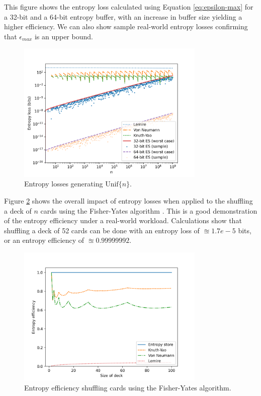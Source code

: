 \documentclass[12pt]{article}
\newcommand{\unif}[1]{\mathrm{Unif}\{#1\}}
\begin{document}
This figure shows the entropy loss calculated using Equation \ref{eq:epsilon-max} for a 32-bit and a 64-bit entropy buffer, with an increase in buffer size yielding a higher efficiency. We can also show sample real-world entropy losses confirming that $\epsilon_{max}$ is an upper bound.

\begin{figure}[ht]
\centering
\includegraphics[width=0.8\textwidth]{uniform_losses.png}
\caption{Entropy losses generating $\unif{n}$.}
\label{fig:uniform-losses}
\end{figure}

Figure \ref{fig:shuffling-efficiency} shows the overall impact of entropy losses when applied to the shuffling a deck of $n$ cards using the Fisher-Yates algorithm \cite{fisher1953statistical, durstenfeld1964algorithm, knuth2014art}. This is a good demonstration of the entropy efficiency under a real-world workload. Calculations show that shuffling a deck of 52 cards can be done with an entropy loss of $\approxeq 1.7e-5$ bits, or an entropy efficiency of $\approxeq 0.99999992$.

\begin{figure}[ht]
\centering
\includegraphics[width=0.8\textwidth]{shuffling_efficiency.png}
\caption{Entropy efficiency shuffling cards using the Fisher-Yates algorithm.}
\label{fig:shuffling-efficiency}
\end{figure}
\end{document}
